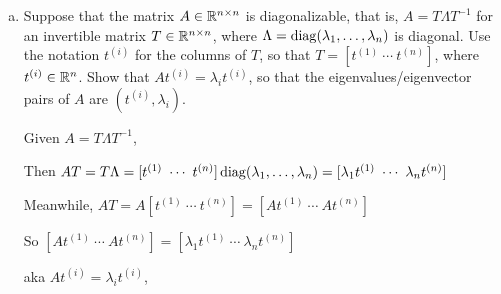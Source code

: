   \begin{enumerate}[(a)]
  \item
    \label{item:diagonalizable-A}
    Suppose that the matrix $A \in \mathbb{R}^{n \times n}$ is diagonalizable,
    that is, $A = T \Lambda T^{-1}$ for an invertible matrix $T \in \mathbb{R}^{n
      \times n}$, where $\Lambda = \mathop{\rm diag}(\lambda_1, \ldots, \lambda_n)$ is
    diagonal. Use the notation $t^{(i)}$ for the columns
    of $T$, so that $T = [t^{(1)} ~ \cdots ~ t^{(n)}]$, where $t^{(i)} \in \mathbb{R}^n$. Show
    that $A t^{(i)} = \lambda_i t^{(i)}$, so that
    the eigenvalues/eigenvector pairs of $A$ are $(t^{(i)}, \lambda_i)$.

    Given $A = T \Lambda T ^ {-1}$, 
    
    Then $ A T = T \Lambda = [t^{(1)} ~ \cdots ~ t^{(n)}] \mathop{\rm diag}(\lambda_1, \ldots, \lambda_n) = [\lambda_1 t^{(1)} ~ \cdots ~ \lambda_n t^{(n)}] $
    
    Meanwhile, $ A T = A [t^{(1)} ~ \cdots ~ t^{(n)}] = [A t^{(1)} ~ \cdots ~ A t^{(n)}]$

    So $[A t^{(1)} ~ \cdots ~ A t^{(n)}] = [\lambda_1 t^{(1)} ~ \cdots ~ \lambda_n t^{(n)}]$

    aka $A t^{(i)} = \lambda_i t^{(i)}$,

  \end{enumerate}

